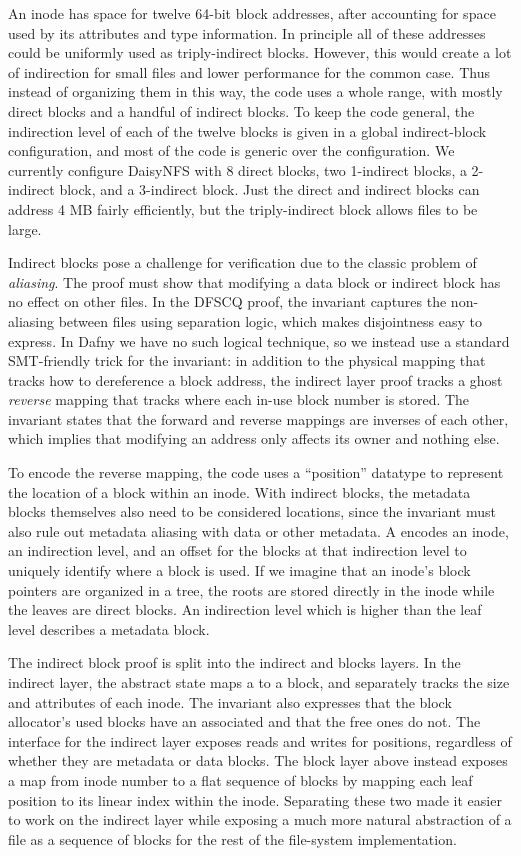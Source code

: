 An inode has space for twelve 64-bit block addresses, after accounting for space
used by its attributes and type information. In principle all of these addresses
could be uniformly used as triply-indirect blocks. However, this would create a
lot of indirection for small files and lower performance for the common case.
Thus instead of organizing them in this way, the code uses a whole range, with
mostly direct blocks and a handful of indirect blocks. To keep the code general,
the indirection level of each of the twelve blocks is given in a global
indirect-block configuration, and most of the code is generic over the configuration. We currently
configure DaisyNFS with 8 direct blocks, two 1-indirect blocks, a 2-indirect
block, and a 3-indirect block. Just the direct and indirect blocks can address 4
MB fairly efficiently, but the triply-indirect block allows files to be large.

Indirect blocks pose a challenge for verification due to the classic problem of
\emph{aliasing}. The proof must show that modifying a data block or indirect
block has no effect on other files. In the DFSCQ proof, the invariant
captures the non-aliasing between files using separation logic, which makes
disjointness easy to express. In Dafny we have no such logical
technique, so we instead use a standard SMT-friendly trick for the invariant: in
addition to the physical mapping that tracks how to dereference a block address,
the indirect layer proof tracks a ghost \emph{reverse} mapping that tracks where
each in-use block number is stored. The invariant states that the forward and reverse
mappings are inverses of each other, which implies that modifying an address
only affects its owner and nothing else.

To encode the reverse mapping, the code uses a ``position'' datatype  to
represent the location of a block within an inode. With indirect blocks, the
metadata blocks themselves also need to be considered locations, since the
invariant must also rule out metadata aliasing with data or other metadata. A
 encodes an inode, an indirection level, and an offset for the blocks at
that indirection level to uniquely identify where a block is used. If we imagine
that an inode's block pointers are organized in a tree, the roots are stored
directly in the inode while the leaves are direct blocks. An indirection level
which is higher than the leaf level describes a metadata block.

The indirect block proof is split into the indirect and blocks layers. In the
indirect layer, the abstract state maps a  to a block, and separately
tracks the size and attributes of each inode. The invariant also expresses that
the block allocator's used blocks have an associated  and that the free
ones do not. The interface for the indirect layer exposes reads and writes for
positions, regardless of whether they are metadata or data blocks. The block
layer above instead exposes a map from inode number to a flat sequence of blocks by
mapping each leaf position to its linear index within the inode. Separating
these two made it easier to work on the indirect layer while exposing a much
more natural abstraction of a file as a sequence of blocks for the rest of the
file-system implementation.


